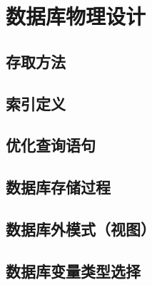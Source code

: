 \documentclass{article}
\begin{document}
\section{数据库物理设计}

\subsection{存取方法}

\subsection{索引定义}

\subsection{优化查询语句}

\subsection{数据库存储过程}

\subsection{数据库外模式（视图）}

\subsection{数据库变量类型选择}
\end{document}
